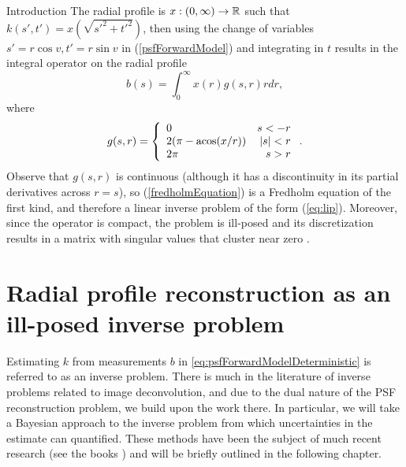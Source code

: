 \begin{chapter}{Introduction}
The radial profile is $x:(0,\infty)\to \mathbb R$ such that $k(s',t') = x( \sqrt{{s'}^2 + {t'}^2})$, then using the change of variables $s' = r\cos v, t'= r\sin v$ in (\ref{psfForwardModel}) and integrating in $t$ results in the integral operator on the radial profile
\begin{equation}\label{eq:fredholmEquation}
  b(s) = \int_0^\infty x(r) g(s,r) r dr, 
\end{equation}
where
\begin{equation}
  g(s,r) = \left\{\begin{array}{lr}
    0 & s < - r\\
    2(\pi - \operatorname*{acos}(x/r)) & |s| < r\\
    2\pi &  s> r
  \end{array}\right..  \label{g_form}
\end{equation}
Observe that $g(s,r)$ is continuous (although it has a discontinuity in its partial derivatives across $r=s$),
so (\ref{fredholmEquation}) is a Fredholm equation of the first kind, and therefore a linear inverse problem of the form (\ref{eq:lip}).
Moreover, since the operator is compact, the problem is ill-posed and its discretization results in a matrix with singular values that cluster near zero \citep{Han10}.

\section{Radial profile reconstruction as an ill-posed inverse problem}

  Estimating $k$ from measurements $b$ in \ref{eq:psfForwardModelDeterministic} is referred to as an inverse problem. 
  There is much in the literature of inverse problems related to image deconvolution, and due to the dual nature of the PSF reconstruction problem, we build upon the work there.
  In particular, we will take a Bayesian approach to the inverse problem from which uncertainties in the estimate can quantified.
  These methods have been the subject of much recent research (see the books \citep{Calvetti,Kaipo,Stuart}) and will be briefly outlined in the following chapter.
  

\end{chapter}
